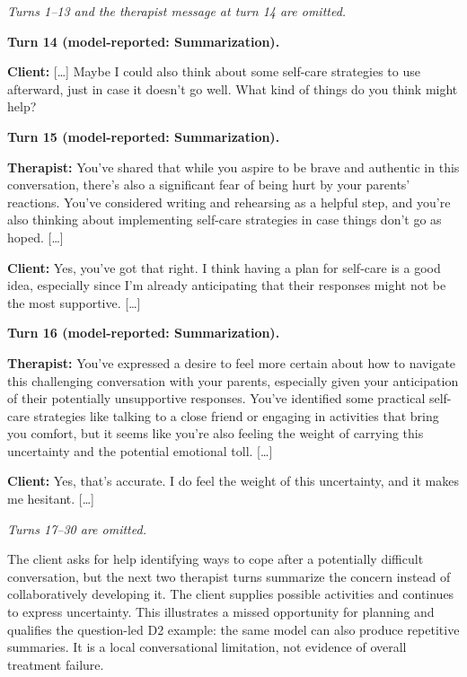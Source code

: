 \begin{tcolorbox}[breakable,colback=gray!5,colframe=gray!45,
    boxrule=0.5pt,arc=2mm,left=3mm,right=3mm,top=2mm,bottom=2mm,
    title={Conversational limitation: repeated summaries in D2} ,colbacktitle=gray!15,coltitle=black]
\small\linespread{1.15}\selectfont
\textit{Turns 1--13 and the therapist message at turn 14 are omitted.}\par\medskip
\textbf{Turn 14 (model-reported: Summarization).}\par
\textbf{Client:} [\ldots] Maybe I could also think about some self-care strategies to use afterward, just in case it doesn’t go well. What kind of things do you think might help?\par\medskip\textbf{Turn 15 (model-reported: Summarization).}\par
\textbf{Therapist:} You've shared that while you aspire to be brave and authentic in this conversation, there's also a significant fear of being hurt by your parents' reactions. You've considered writing and rehearsing as a helpful step, and you're also thinking about implementing self-care strategies in case things don't go as hoped. [\ldots]\par
\textbf{Client:} Yes, you’ve got that right. I think having a plan for self-care is a good idea, especially since I’m already anticipating that their responses might not be the most supportive. [\ldots]\par\medskip\textbf{Turn 16 (model-reported: Summarization).}\par
\textbf{Therapist:} You've expressed a desire to feel more certain about how to navigate this challenging conversation with your parents, especially given your anticipation of their potentially unsupportive responses. You've identified some practical self-care strategies like talking to a close friend or engaging in activities that bring you comfort, but it seems like you're also feeling the weight of carrying this uncertainty and the potential emotional toll. [\ldots]\par
\textbf{Client:} Yes, that's accurate. I do feel the weight of this uncertainty, and it makes me hesitant. [\ldots]\par\medskip\textit{Turns 17--30 are omitted.}
\end{tcolorbox}

The client asks for help identifying ways to cope after a potentially difficult conversation, but the next two therapist turns summarize the concern instead of collaboratively developing it. The client supplies possible activities and continues to express uncertainty. This illustrates a missed opportunity for planning and qualifies the question-led D2 example: the same model can also produce repetitive summaries. It is a local conversational limitation, not evidence of overall treatment failure.

